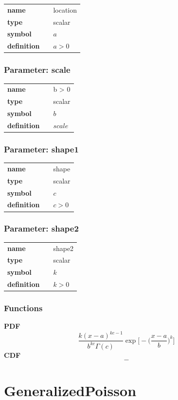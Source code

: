 \documentclass{article}
\begin{document}
\noindent\begin{tabular}{p{2cm}cl}
\textbf{name} & & location \\
\textbf{type} & & scalar \\
\textbf{symbol} & & $a$  \\
\textbf{definition} & & $a > 0$
\end{tabular}
\subsubsection*{Parameter: scale}

\noindent\begin{tabular}{p{2cm}cl}
\textbf{name} & & b > 0 \\
\textbf{type} & & scalar \\
\textbf{symbol} & & $b$  \\
\textbf{definition} & & $scale$
\end{tabular}
\subsubsection*{Parameter: shape1}

\noindent\begin{tabular}{p{2cm}cl}
\textbf{name} & & shape \\
\textbf{type} & & scalar \\
\textbf{symbol} & & $c$  \\
\textbf{definition} & & $c > 0$
\end{tabular}
\subsubsection*{Parameter: shape2}

\noindent\begin{tabular}{p{2cm}cl}
\textbf{name} & & shape2 \\
\textbf{type} & & scalar \\
\textbf{symbol} & & $k$  \\
\textbf{definition} & & $k > 0$
\end{tabular}
\subsubsection*{Functions}

\smallskip \noindent \hspace{.2cm} \textbf{PDF} 
\begin{equation*}\frac{k (x-a)^{kc-1}}{b^{kc}\Gamma(c)}\exp\Big[-\Big(\frac{x-a}{b}\Big)^k\Big]\end{equation*}
\smallskip \noindent \hspace{.2cm} \textbf{CDF} 
\begin{equation*}-\end{equation*}
\smallskip\section*{GeneralizedPoisson} 
\end{document}

